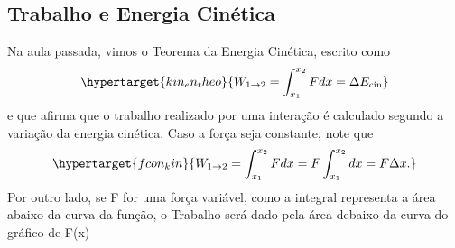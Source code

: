 \documentclass{article}
\begin{document}
\subsection{Trabalho e Energia Cinética}
  Na aula passada, vimos o Teorema da Energia Cinética, escrito como 
    \[
      \hypertarget{kin_en_theo}{W_{1\rightarrow 2} = \int_{x_1}^{x_2}Fdx = \Delta E_{\text{cin}}}
    \]
    e que afirma que o trabalho realizado por uma intera\c cão é calculado segundo a variação
    da energia cinética. Caso a for\c ca seja constante, note que 
      \[
        \hypertarget{fcon_kin}{W_{1\rightarrow 2} = \int_{x_1}^{x_2} Fdx = F\int_{x_1}^{x_2}dx = F\Delta x.}
      \]
    Por outro lado, se F for uma for\c ca variável, como a integral representa a área
    abaixo da curva da fun\c cão, o Trabalho será dado pela área debaixo da curva do 
    gráfico de F(x)

\end{document}
